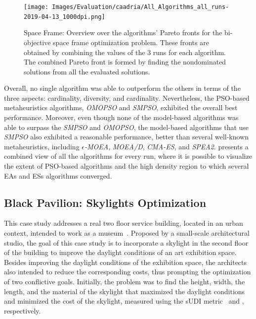 \begin{figure}[htbp]
	\centering
	\texttt{[image: Images/Evaluation/caadria/All\_Algorithms\_all\_runs-2019-04-13\_1000dpi.png]}
	\caption[Space Frame: Overview over the algorithms' Pareto fronts]{Space Frame: Overview over the algorithms' Pareto fronts for the bi-objective space frame optimization problem. These fronts are obtained by combining the values of the 3 runs for each algorithm. The combined Pareto front is formed by finding the nondominated solutions from all the evaluated solutions.}
	\label{fig:allruns}
\end{figure}

Overall, no single algorithm was able to outperform the others in terms of the three aspects: cardinality, diversity, and cardinality. Nevertheless, the \ac{PSO}-based metaheuristics algorithms, \textit{OMOPSO} and \textit{SMPSO}, exhibited the overall best performance. Moreover, even though none of the model-based algorithms was able to surpass the \textit{SMPSO} and \textit{OMOPSO}, the model-based algorithms that use \textit{SMPSO} also exhibited a reasonable performance, better than several well-known metaheuristics, including \textit{$\epsilon$-MOEA}, \textit{MOEA/D}, \textit{CMA-ES}, and \textit{\ac{SPEA2}}.  presents a combined view of all the algorithms for every run, where it is possible to visualize the extent of \ac{PSO}-based algorithms and the high density region to which several \acp{EA} and \acp{ES} algorithms converged.

\subsection{Black Pavilion: Skylights Optimization}

This case study addresses a real two floor service building, located in an urban context, intended to work as a museum~\cite{Caetano2018,IP2019MOO}. Proposed by a small-scale architectural studio, the goal of this case study is to incorporate a skylight in the second floor of the building to improve the daylight conditions of an art exhibition space. Besides improving the daylight conditions of the exhibition space, the architects also intended to reduce the corresponding costs, thus prompting the optimization of two conflictive goals. Initially, the problem was to find the height, width, the length, and the material of the skylight that maximized the daylight conditions and minimized the cost of the skylight, measured using the \ac{sUDI} metric~\cite{Nabil2006} and  , respectively. 

